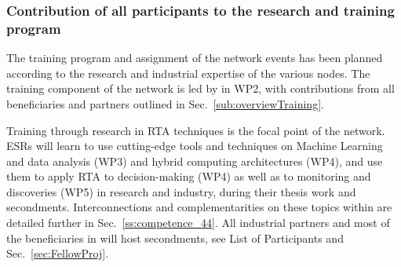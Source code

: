 \subsubsection{Contribution of all participants to the research and training program}
\label{sec:trainingcontrib}


The training program and assignment of the network events has been planned according to the research and industrial expertise of the various nodes.
The training component of the network is led by \unigeentity in WP2, with contributions from all beneficiaries and partners outlined in Sec.~\ref{sub:overviewTraining}.  

Training through research in RTA techniques is the focal point of the network. 
ESRs will learn to use cutting-edge tools and techniques on Machine Learning and data analysis (WP3) and hybrid computing architectures (WP4), and use them to apply RTA to decision-making (WP4) as well as to monitoring and discoveries (WP5) in research and industry, during their thesis work and secondments.
Interconnections and complementarities on these topics within \acronym are detailed further in Sec.~\ref{ss:competence_44}. 
All industrial partners and most of the beneficiaries in \acronym will host secondments, see List of Participants and Sec.~\ref{sec:FellowProj}. 

